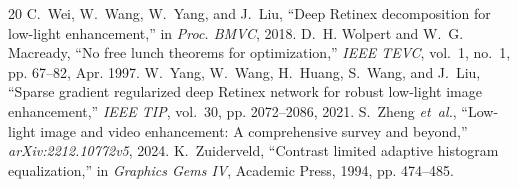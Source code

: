 \documentclass[journal]{IEEEtran}
\begin{document}
\begin{thebibliography}{20}
C.~Wei, W.~Wang, W.~Yang, and J.~Liu, ``Deep Retinex decomposition for low-light enhancement,'' in \emph{Proc. BMVC}, 2018.
D.~H. Wolpert and W.~G. Macready, ``No free lunch theorems for optimization,'' \emph{IEEE TEVC}, vol.~1, no.~1, pp. 67--82, Apr. 1997.
W.~Yang, W.~Wang, H.~Huang, S.~Wang, and J.~Liu, ``Sparse gradient regularized deep Retinex network for robust low-light image enhancement,'' \emph{IEEE TIP}, vol.~30, pp. 2072--2086, 2021.
S.~Zheng \emph{et~al.}, ``Low-light image and video enhancement: A comprehensive survey and beyond,'' \emph{arXiv:2212.10772v5}, 2024.
K.~Zuiderveld, ``Contrast limited adaptive histogram equalization,'' in \emph{Graphics Gems IV}, Academic Press, 1994, pp. 474--485.
\end{thebibliography}
\end{document}

